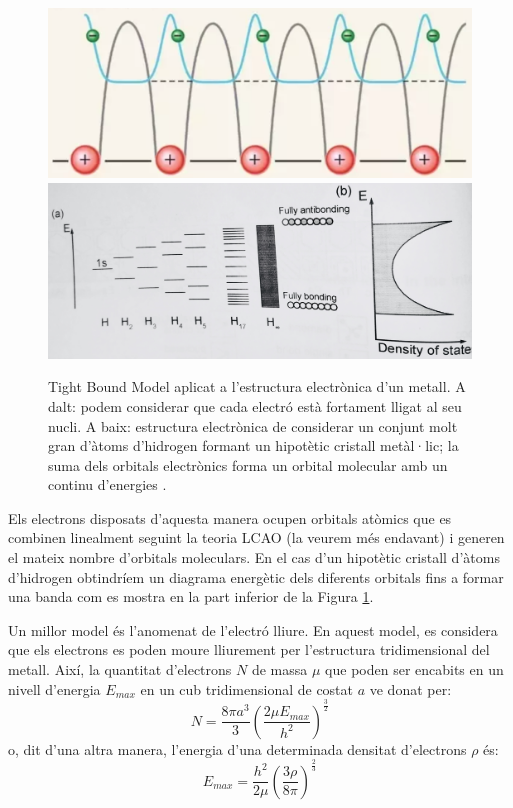 \begin{figure}[h]
\centering
\includegraphics[scale=0.5]{figures/TightBoundModel1.png}
\includegraphics[scale=0.13]{figures/TightBoundModel2.png}
\caption[Tight Bound Model]{Tight Bound Model aplicat a l'estructura electrònica d'un metall. A dalt: podem considerar que cada electró està fortament lligat al seu nucli. A baix: estructura electrònica de considerar un conjunt molt gran d'àtoms d'hidrogen formant un hipotètic cristall metàl·lic; la suma dels orbitals electrònics forma un orbital molecular  amb un continu d'energies \cite{Yen2008}.}
\label{fig:TightBoundModel}
\end{figure}

Els electrons disposats d'aquesta manera ocupen orbitals atòmics que es combinen linealment seguint la teoria LCAO (la veurem més endavant) i generen el mateix nombre d'orbitals moleculars. En el cas d'un hipotètic cristall d'àtoms d'hidrogen obtindríem un diagrama energètic dels diferents orbitals fins a formar una banda com es mostra en la part inferior de la Figura \ref{fig:TightBoundModel}.

Un millor model és l'anomenat de l'electró lliure. 
En aquest model, es considera que els electrons es poden moure lliurement per l'estructura tridimensional del metall. 
Així, la quantitat d'electrons $N$ de massa $\mu$ que poden ser encabits en un nivell d'energia $E_{max}$ en un cub tridimensional de costat $a$ ve donat per:
\[
N=\frac{8 \pi a^3}{3} \left( \frac{2 \mu E_{max}}{h^2} \right)^{\frac{3}{2}}
\]
o, dit d'una altra manera, l'energia d'una determinada densitat d'electrons $\rho$ és:
\[E_{max} = \frac{h^2}{2 \mu} \left( \frac{3 \rho}{8 \pi} \right)^{\frac{2}{3}}\]

